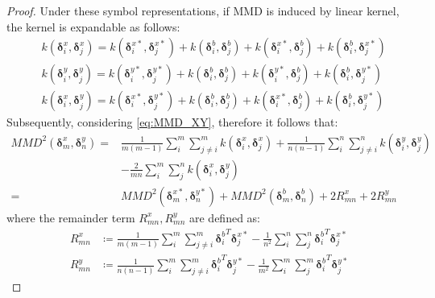\documentclass{article}
\begin{document}
\begin{proof}
Under these symbol representations, if MMD is induced by linear kernel, the kernel is expandable as follows:
\begin{equation}
    \begin{aligned}
        & k(\bm{\delta}_i^x, \bm{\delta}_j^x) = k(\bm{\delta}_i^{x*}, \bm{\delta}_j^{x*}) + k(\bm{\delta}_i^b, \bm{\delta}_j^b) + k(\bm{\delta}_i^{x*}, \bm{\delta}_j^b) + k(\bm{\delta}_i^b, \bm{\delta}_j^{x*}) \\
        & k(\bm{\delta}_i^y, \bm{\delta}_j^y) = k(\bm{\delta}_i^{y*}, \bm{\delta}_j^{y*}) + k(\bm{\delta}_i^b, \bm{\delta}_j^b) + k(\bm{\delta}_i^{y*}, \bm{\delta}_j^b) + k(\bm{\delta}_i^b, \bm{\delta}_j^{y*}) \\
        & k(\bm{\delta}_i^x, \bm{\delta}_j^y) = k(\bm{\delta}_i^{x*}, \bm{\delta}_j^{y*}) + k(\bm{\delta}_i^b, \bm{\delta}_j^b) + k(\bm{\delta}_i^{x*}, \bm{\delta}_j^b) + k(\bm{\delta}_i^b, \bm{\delta}_j^{y*})
    \end{aligned}
\end{equation}
Subsequently, considering \eqref{eq:MMD_XY}, therefore it follows that:
\begin{equation}\label{eq:MMDMMD}
    \begin{aligned}
        MMD^2\left(\bm{\delta}_m^x, \bm{\delta}_n^y\right) = &
        \frac{1}{m(m-1)}\sum_{i}^{m}\sum_{j\neq i}^{m}k(\bm{\delta}_i^x, \bm{\delta}_j^x)
        + \frac{1}{n(n-1)}\sum_{i}^{n}\sum_{j\neq i}^{n}k(\bm{\delta}_i^y, \bm{\delta}_j^y) \\
        & - \frac{2}{mn}\sum_{i}^{m}\sum_{j}^{n}k(\bm{\delta}_i^x, \bm{\delta}_j^y) \\
        = & MMD^2\left(\bm{\delta}_m^{x*}, \bm{\delta}_n^{y*}\right) + MMD^2\left(\bm{\delta}_m^b, \bm{\delta}_n^b\right) + 2R_{mn}^x + 2R_{mn}^y
    \end{aligned}
\end{equation}
where the remainder term $R_{mn}^x, R_{mn}^y$ are defined as:
\begin{equation}
    \begin{aligned}
        R_{mn}^x & \coloneqq \frac{1}{m(m-1)}\sum_{i}^{m}\sum_{j\neq i}^{m}{\bm{\delta}_i^b}^T \bm{\delta}_j^{x*} - \frac{1}{n^2}\sum_{i}^{n}\sum_{j}^{n}{\bm{\delta}_i^b}^T \bm{\delta}_j^{x*} \\
        R_{mn}^y & \coloneqq \frac{1}{n(n-1)}\sum_{i}^{m}\sum_{j\neq i}^{m}{\bm{\delta}_i^b}^T \bm{\delta}_j^{y*} - \frac{1}{m^2}\sum_{i}^{m}\sum_{j}^{m}{\bm{\delta}_i^b}^T \bm{\delta}_j^{y*}
    \end{aligned}
\end{equation}


\end{proof}
\end{document}
